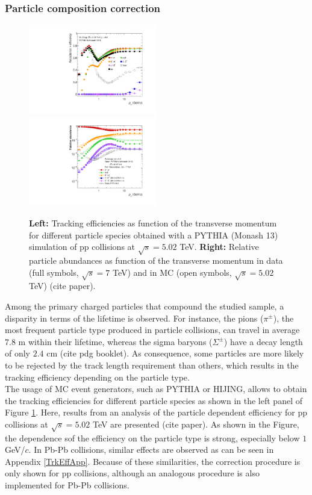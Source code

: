 \documentclass[12pt,a4paper]{report}
\begin{document}
\subsubsection{Particle composition correction}
\begin{figure}[tb!]
\centering
\includegraphics[width=0.495\textwidth]{Plots/5TeVMonash13_TrkEff_without-91972.pdf}  
\includegraphics[width=0.495\textwidth]{Plots/5TeVMonash13_Abundances-91973.pdf}  
\caption{\textbf{Left: }Tracking efficiencies as function of the transverse momentum for different particle species obtained with a PYTHIA (Monash 13) simulation of pp collisions at $\sqrt{s} = 5.02$ TeV. \textbf{Right:} Relative particle abundances as function of the transverse momentum in data (full symbols,  $\sqrt{s} = 7$ TeV) and in MC (open symbols,  $\sqrt{s} = 5.02$ TeV) (cite paper).}
\label{trckEffParticles}
\end{figure}
Among the primary charged particles that compound the studied sample, a disparity in terms of the lifetime is observed. For instance, the pions ($\pi^{\pm}$), the most frequent particle type produced in particle collisions, can travel in average $7.8\text{ m}$ within their lifetime, whereas the sigma baryons ($\Sigma^{\pm}$) have a decay length of only $2.4\text{ cm}$ (cite pdg booklet). As consequence, some particles are more likely to be rejected by the track length requirement than others, which results in the tracking efficiency depending on the particle type. \\
The usage of MC event generators, such as PYTHIA or HIJING, allows to obtain the tracking efficiencies for different particle species as shown in the left panel of Figure \ref{trckEffParticles}. Here, results from  an analysis of the particle dependent efficiency for pp collisions at $\sqrt{s} = 5.02$ TeV are presented (cite paper). As shown in the Figure, the dependence sof the efficiency on the particle type is strong, especially below $1$ GeV/$c$. In Pb-Pb collisions, similar effects are observed as can be seen in Appendix \ref{TrkEffApp}. Because of these similarities, the correction procedure is only shown for pp collisions, although an analogous procedure is also implemented for Pb-Pb collisions.\\
\end{document}
